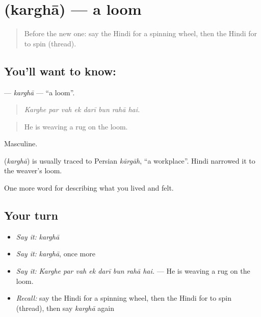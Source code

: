 \section[\texorpdfstring{\hi{करघा} (karghā)}{करघा (karghā)}]{ (karghā) — a loom}

\label{lesson:HI-C512-kargha}



\begin{quote}
Before the new one: say the Hindi for a spinning wheel, then the Hindi for to spin (thread).
\end{quote}

\subsection*{You'll want to know: }
\textbf{} — \emph{karghā} — \textquotedblleft{}a loom\textquotedblright{}.

\begin{quote}
       
\end{quote}

\begin{quote}
\emph{Karghe par vah ek darī bun rahā hai.}
\end{quote}

\begin{quote}
He is weaving a rug on the loom.
\end{quote}

Masculine.

\begin{cousinweb}
\textbf{} (\emph{karghā}) is usually traced to Persian \emph{kārgāh}, \textquotedblleft{}a workplace\textquotedblright{}. Hindi narrowed it to the weaver's loom.
\end{cousinweb}

\begin{grammarlens}[title={What you've built}]
One more word for describing what you lived and felt.
\end{grammarlens}

\subsection*{Your turn}
\begin{itemize}
\raggedright
  \item \emph{Say it:} \emph{karghā}
  \item \emph{Say it:} \emph{karghā}, once more
  \item \emph{Say it:} \emph{Karghe par vah ek darī bun rahā hai.} — He is weaving a rug on the loom.
  \item \emph{Recall:} say the Hindi for a spinning wheel, then the Hindi for to spin (thread), then say \emph{karghā} again
\end{itemize}

